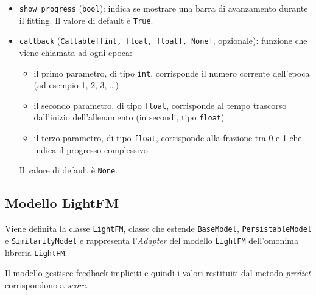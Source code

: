 \begin{itemize}
    \item \texttt{show\_progress} (\texttt{bool}): indica se mostrare una barra di avanzamento durante il fitting. Il valore di default è \texttt{True}.
    \item \texttt{callback} (\texttt{Callable[[int, float, float], None]}, opzionale): funzione che viene chiamata ad ogni epoca:
    \begin{itemize}
        \item il primo parametro, di tipo \texttt{int}, corrisponde il numero corrente dell'epoca (ad esempio 1, 2, 3, \ldots)
        \item il secondo parametro, di tipo \texttt{float}, corrisponde al tempo trascorso dall'inizio dell'allenamento (in secondi, tipo \texttt{float})
        \item il terzo parametro, di tipo \texttt{float}, corrisponde alla frazione tra 0 e 1 che indica il progresso complessivo
    \end{itemize}
    Il valore di default è \texttt{None}.
\end{itemize}

\subsection{Modello LightFM}
Viene definita la classe \texttt{LightFM}, classe che estende \texttt{BaseModel}, \texttt{PersistableModel} e \texttt{SimilarityModel} e rappresenta l'\textit{Adapter} del modello \texttt{LightFM} dell'omonima libreria \texttt{LightFM}. 

Il modello gestisce feedback impliciti e quindi i valori restituiti dal metodo \textit{predict} corrispondono a \textit{score}.

